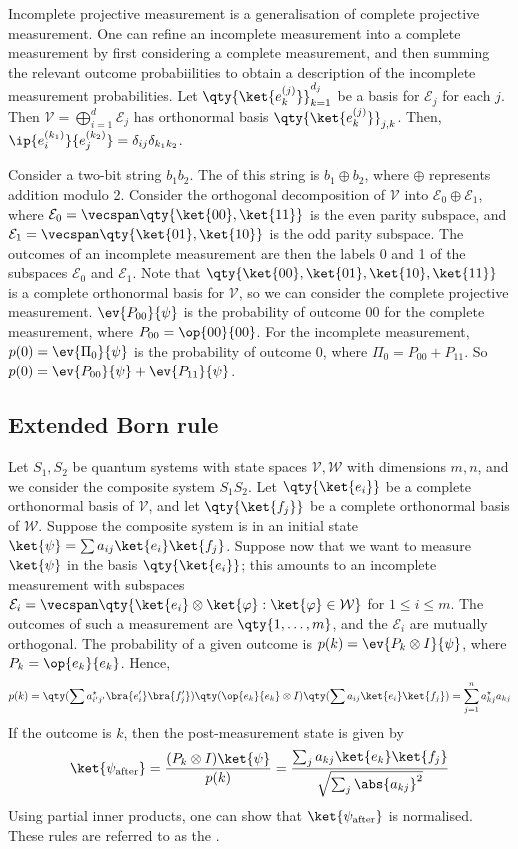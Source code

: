 Incomplete projective measurement is a generalisation of complete projective measurement.
One can refine an incomplete measurement into a complete measurement by first considering a complete measurement, and then summing the relevant outcome probabiilities to obtain a description of the incomplete measurement probabilities.
Let $\qty{\ket{e_k^{(j)}}}_{k=1}^{d_j}$ be a basis for $\mathcal E_j$ for each $j$.
Then $\mathcal V = \bigoplus_{i=1}^d \mathcal E_j$ has orthonormal basis $\qty{\ket{e_k^{(j)}}}_{j,k}$.
Then, $\ip{e_i^{(k_1)}}{e_j^{(k_2)}} = \delta_{ij} \delta_{k_1 k_2}$.

Consider a two-bit string $b_1 b_2$.
The  of this string is $b_1 \oplus b_2$, where $\oplus$ represents addition modulo 2.
Consider the orthogonal decomposition of $\mathcal V$ into $\mathcal E_0 \oplus \mathcal E_1$, where $\mathcal E_0 = \vecspan \qty{\ket{00}, \ket{11}}$ is the even parity subspace, and $\mathcal E_1 = \vecspan \qty{\ket{01}, \ket{10}}$ is the odd parity subspace.
The outcomes of an incomplete measurement are then the labels 0 and 1 of the subspaces $\mathcal E_0$ and $\mathcal E_1$.
Note that $\qty{\ket{00}, \ket{01}, \ket{10}, \ket{11}}$ is a complete orthonormal basis for $\mathcal V$, so we can consider the complete projective measurement.
$\ev{P_{00}}{\psi}$ is the probability of outcome $00$ for the complete measurement, where $P_{00} = \op{00}{00}$.
For the incomplete measurement, $p(0) = \ev{\Pi_0}{\psi}$ is the probability of outcome 0, where $\Pi_0 = P_{00} + P_{11}$.
So $p(0) = \ev{P_{00}}{\psi} + \ev{P_{11}}{\psi}$.

\subsection{Extended Born rule}
Let $S_1, S_2$ be quantum systems with state spaces $\mathcal V, \mathcal W$ with dimensions $m, n$, and we consider the composite system $S_1 S_2$.
Let $\qty{\ket{e_i}}$ be a complete orthonormal basis of $\mathcal V$, and let $\qty{\ket{f_j}}$ be a complete orthonormal basis of $\mathcal W$.
Suppose the composite system is in an initial state $\ket{\psi} = \sum a_{ij} \ket{e_i} \ket{f_j}$.
Suppose now that we want to measure $\ket{\psi}$ in the basis $\qty{\ket{e_i}}$; this amounts to an incomplete measurement with subspaces $\mathcal E_i = \vecspan \qty{\ket{e_i} \otimes \ket{\varphi} : \ket{\varphi} \in \mathcal W}$ for $1 \leq i \leq m$.
The outcomes of such a measurement are $\qty{1, \dots, m}$, and the $\mathcal E_i$ are mutually orthogonal.
The probability of a given outcome is $p(k) = \ev{P_k \otimes I}{\psi}$, where $P_k = \op{e_k}{e_k}$.
Hence,
\[ p(k) = \qty(\sum a_{i'j'}^\star \bra{e_i'} \bra{f_j'}) \qty(\op{e_k}{e_k} \otimes I) \qty(\sum a_{ij} \ket{e_i} \ket{f_j}) = \sum_{j=1}^n a_{kj}^\star a_{kj} \]
If the outcome is $k$, then the post-measurement state is given by
\[ \ket{\psi_{\text{after}}} = \frac{(P_k \otimes I)\ket{\psi}}{p(k)} = \frac{\sum_j a_{kj} \ket{e_k} \ket{f_j}}{\sqrt{\sum_j \abs{a_{kj}}^2}} \]
Using partial inner products, one can show that $\ket{\psi_{\text{after}}}$ is normalised.
These rules are referred to as the .

